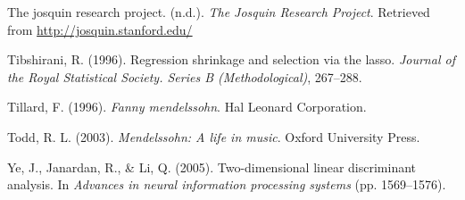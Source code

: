 \documentclass[12pt,twoside]{reedthesis}
\theoremstyle{definition}
\theoremstyle{definition}
\theoremstyle{definition}
\theoremstyle{remark}
\begin{document}
\hypertarget{ref-jrp}{}
The josquin research project. (n.d.). \emph{The Josquin Research
Project}. Retrieved from \url{http://josquin.stanford.edu/}

\hypertarget{ref-lasso}{}
Tibshirani, R. (1996). Regression shrinkage and selection via the lasso.
\emph{Journal of the Royal Statistical Society. Series B
(Methodological)}, 267--288.

\hypertarget{ref-tillard1996}{}
Tillard, F. (1996). \emph{Fanny mendelssohn}. Hal Leonard Corporation.

\hypertarget{ref-todd2003}{}
Todd, R. L. (2003). \emph{Mendelssohn: A life in music}. Oxford
University Press.

\hypertarget{ref-ldadim}{}
Ye, J., Janardan, R., \& Li, Q. (2005). Two-dimensional linear
discriminant analysis. In \emph{Advances in neural information
processing systems} (pp. 1569--1576).


\end{document}
